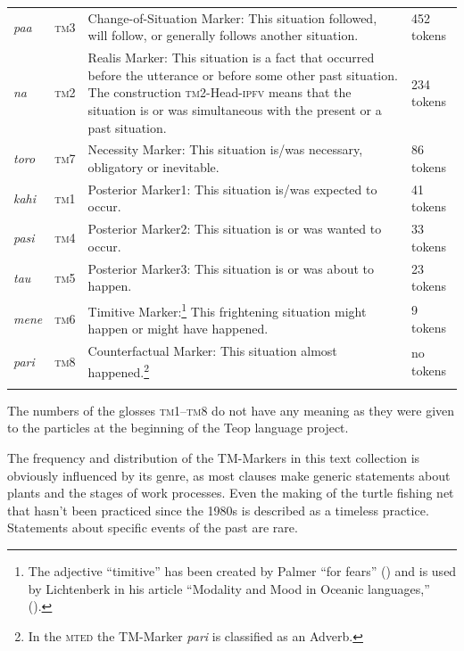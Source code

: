 \documentclass[output=paper]{langscibook}
\begin{document}
\begin{table}[b]
\begin{tabularx}{\textwidth}{llQl}
        \textit{paa}&\textsc{tm}3&Change-of-Situation Marker: This situation followed, will follow, or generally follows another situation.&452 tokens\\
        \textit{na}&\textsc{tm}2&Realis Marker: This situation is a fact that occurred before the utterance or before some other past situation. The construction \textsc{tm}2-Head-\textsc{ipfv} means that the situation is or was simultaneous with the present or a past situation.&234 tokens\\
        \textit{toro}&\textsc{tm}7&Necessity Marker: This situation is/was necessary, obligatory or inevitable.&86 tokens\\
        \textit{kahi}&\textsc{tm}1&Posterior Marker1: This situation is/was expected to occur.&41 tokens\\
        \textit{pasi}&\textsc{tm}4&Posterior Marker2: This situation is or was wanted to occur.&33 tokens\\
        \textit{tau}&\textsc{tm}5&Posterior Marker3: This situation is or was about to happen.&23 tokens\\
        \textit{mene}&\textsc{tm}6&Timitive Marker:\footnote{The adjective ``timitive'' has been created by Palmer ``for fears'' (\citeyear[133-134]{Palmer:2001cj}) and is used by Lichtenberk in his article ``Modality and Mood in Oceanic languages,'' (\citeyear[346--349]{Lichtenberk:2016ph}).} This frightening situation might happen or might have happened.&9 tokens\\
        \textit{pari}&\textsc{tm}8&Counterfactual Marker: This situation almost happened.\footnote{In the \textsc{mted} the TM-Marker \textit{pari} is classified as an Adverb.}&no tokens\\
    \lspbottomrule
\end{tabularx}
\end{table}


The numbers of the glosses \textsc{tm}1--\textsc{tm}8 do not have any meaning as they were given to the particles at the beginning of the Teop language project.

The frequency and distribution of the TM-Markers in this text collection is obviously influenced by its genre, as most clauses make generic statements about plants and the stages of work processes. Even the making of the turtle fishing net that hasn't been practiced since the 1980s is described as a timeless practice. Statements about specific events of the past are rare.
\end{document}
